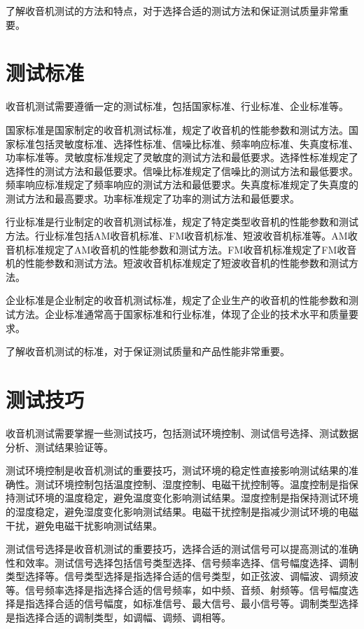 \documentclass[12pt,UTF8]{ctexbook}
\begin{document}
了解收音机测试的方法和特点，对于选择合适的测试方法和保证测试质量非常重要。

\section{测试标准}

收音机测试需要遵循一定的测试标准，包括国家标准、行业标准、企业标准等。

国家标准是国家制定的收音机测试标准，规定了收音机的性能参数和测试方法。国家标准包括灵敏度标准、选择性标准、信噪比标准、频率响应标准、失真度标准、功率标准等。灵敏度标准规定了灵敏度的测试方法和最低要求。选择性标准规定了选择性的测试方法和最低要求。信噪比标准规定了信噪比的测试方法和最低要求。频率响应标准规定了频率响应的测试方法和最低要求。失真度标准规定了失真度的测试方法和最高要求。功率标准规定了功率的测试方法和最低要求。

行业标准是行业制定的收音机测试标准，规定了特定类型收音机的性能参数和测试方法。行业标准包括AM收音机标准、FM收音机标准、短波收音机标准等。AM收音机标准规定了AM收音机的性能参数和测试方法。FM收音机标准规定了FM收音机的性能参数和测试方法。短波收音机标准规定了短波收音机的性能参数和测试方法。

企业标准是企业制定的收音机测试标准，规定了企业生产的收音机的性能参数和测试方法。企业标准通常高于国家标准和行业标准，体现了企业的技术水平和质量要求。

了解收音机测试的标准，对于保证测试质量和产品性能非常重要。

\section{测试技巧}

收音机测试需要掌握一些测试技巧，包括测试环境控制、测试信号选择、测试数据分析、测试结果验证等。

测试环境控制是收音机测试的重要技巧，测试环境的稳定性直接影响测试结果的准确性。测试环境控制包括温度控制、湿度控制、电磁干扰控制等。温度控制是指保持测试环境的温度稳定，避免温度变化影响测试结果。湿度控制是指保持测试环境的湿度稳定，避免湿度变化影响测试结果。电磁干扰控制是指减少测试环境的电磁干扰，避免电磁干扰影响测试结果。

测试信号选择是收音机测试的重要技巧，选择合适的测试信号可以提高测试的准确性和效率。测试信号选择包括信号类型选择、信号频率选择、信号幅度选择、调制类型选择等。信号类型选择是指选择合适的信号类型，如正弦波、调幅波、调频波等。信号频率选择是指选择合适的信号频率，如中频、音频、射频等。信号幅度选择是指选择合适的信号幅度，如标准信号、最大信号、最小信号等。调制类型选择是指选择合适的调制类型，如调幅、调频、调相等。
\end{document}
